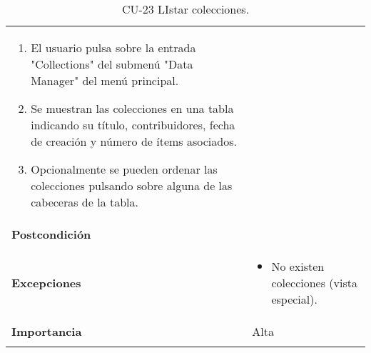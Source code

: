 \begin{longtable}[]{@{}ll@{}}
\begin{minipage}[t]{0.78\columnwidth}
\begin{enumerate}
\def\labelenumi{\arabic{enumi}.}
\tightlist
\item
  El usuario pulsa sobre la entrada "Collections" del submenú "Data
  Manager" del menú principal.
\item
  Se muestran las colecciones en una tabla indicando su título,
  contribuidores, fecha de creación y número de ítems asociados.
\item
  Opcionalmente se pueden ordenar las colecciones pulsando sobre alguna
  de las cabeceras de la tabla.
\end{enumerate}\strut
\end{minipage}\tabularnewline
\begin{minipage}[t]{0.16\columnwidth}\raggedright
\textbf{Postcondición}\strut
\end{minipage} & \begin{minipage}[t]{0.78\columnwidth}\raggedright
\strut
\end{minipage}\tabularnewline
\begin{minipage}[t]{0.16\columnwidth}\raggedright
\textbf{Excepciones}\strut
\end{minipage} & \begin{minipage}[t]{0.78\columnwidth}\raggedright
\begin{itemize}
\tightlist
\item
  No existen colecciones (vista especial).
\end{itemize}\strut
\end{minipage}\tabularnewline
\begin{minipage}[t]{0.16\columnwidth}\raggedright
\textbf{Importancia}\strut
\end{minipage} & \begin{minipage}[t]{0.78\columnwidth}\raggedright
Alta\strut
\end{minipage}\tabularnewline
\bottomrule
\caption{CU-23 LIstar colecciones.}
\end{longtable}

